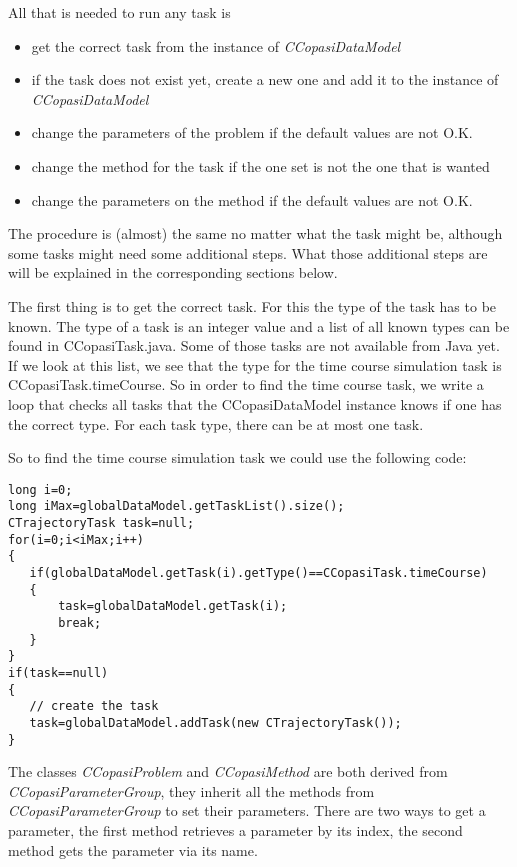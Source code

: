 \documentclass[a4,10pt]{article}
\begin{document}
All that is needed to run any task is 
\begin{itemize}
\item{get the correct task from the instance of \textit{CCopasiDataModel}}
\item{if the task does not exist yet, create a new one and add it to the instance of \textit{CCopasiDataModel}}
\item{change the parameters of the problem if the default values are not O.K.}
\item{change the method for the task if the one set is not the one that is wanted}
\item{change the parameters on the method if the default values are not O.K.}
\end{itemize}

The procedure is (almost) the same no matter what the task might be, although some tasks might need some additional steps. What those additional steps are will be explained in the corresponding sections below.   

The first thing is to get the correct task. For this the type of the task has to be known. The type of a task is an integer value and a list of all known types can be found in CCopasiTask.java. Some of those tasks are not available from Java yet. If we look at this list, we see that the type for the time course simulation task is CCopasiTask.timeCourse. So in order to find the time course task, we write a loop that checks all tasks that the CCopasiDataModel instance knows if one has the correct type. For each task type, there can be at most one task.

So to find the time course simulation task we could use the following code:

\begin{lstlisting}
long i=0;
long iMax=globalDataModel.getTaskList().size();
CTrajectoryTask task=null;
for(i=0;i<iMax;i++)
{
   if(globalDataModel.getTask(i).getType()==CCopasiTask.timeCourse)
   {
       task=globalDataModel.getTask(i);
       break;
   }
}
if(task==null)
{
   // create the task
   task=globalDataModel.addTask(new CTrajectoryTask());
}
\end{lstlisting}

The classes \textit{CCopasiProblem} and \textit{CCopasiMethod} are both derived from \textit{CCopasiParameterGroup}, they inherit all the methods from \textit{CCopasiParameterGroup} to set their parameters.
There are two ways to get a parameter, the first method retrieves a parameter by its index, the second method gets the parameter via its name.
\end{document}
